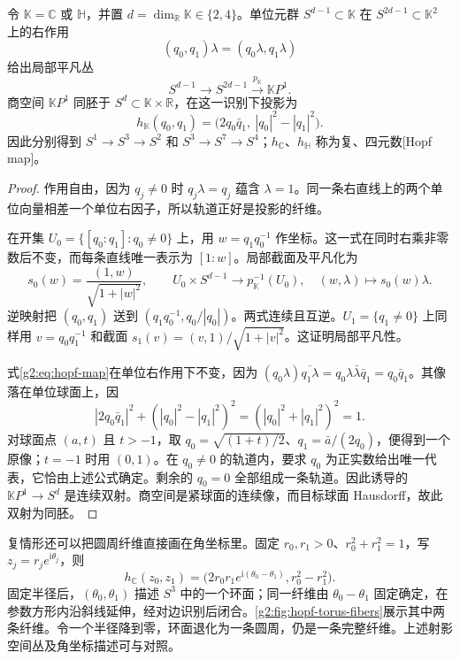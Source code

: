 \begin{proposition}\label{g2:prop:hopf-bundles}
	令 \(\mathbb K=\mathbb C\) 或 \(\mathbb H\)，并置 \(d=\dim_{\mathbb R}\mathbb K\in\{2,4\}\)。单位元群 \(S^{d-1}\subset\mathbb K\) 在 \(S^{2d-1}\subset\mathbb K^2\) 上的右作用
	\[
		(q_0,q_1)\lambda=(q_0\lambda,q_1\lambda)
	\]
	给出局部平凡丛
	\[
		S^{d-1}\longrightarrow S^{2d-1}\xrightarrow{p_{\mathbb K}}\mathbb KP^1.
	\]
	商空间 \(\mathbb KP^1\) 同胚于 \(S^d\subset\mathbb K\times\mathbb R\)，在这一识别下投影为
	\begin{equation}\label{g2:eq:hopf-map}
		h_{\mathbb K}(q_0,q_1)=\bigl(2q_0\bar q_1,\ |q_0|^2-|q_1|^2\bigr).
	\end{equation}
	因此分别得到 \(S^1\rightarrow S^3\rightarrow S^2\) 和 \(S^3\rightarrow S^7\rightarrow S^4\)；\(h_{\mathbb C}\)、\(h_{\mathbb H}\) 称为复、四元数[Hopf map]。
\end{proposition}
\begin{proof}
	作用自由，因为 \(q_j\ne0\) 时 \(q_j\lambda=q_j\) 蕴含 \(\lambda=1\)。同一条右直线上的两个单位向量相差一个单位右因子，所以轨道正好是投影的纤维。

	在开集 \(U_0=\{[q_0:q_1]:q_0\ne0\}\) 上，用 \(w=q_1q_0^{-1}\) 作坐标。这一式在同时右乘非零数后不变，而每条直线唯一表示为 \([1:w]\)。局部截面及平凡化为
	\[
		s_0(w)=\frac{(1,w)}{\sqrt{1+|w|^2}},\qquad
		U_0\times S^{d-1}\longrightarrow p_{\mathbb K}^{-1}(U_0),
		\quad(w,\lambda)\longmapsto s_0(w)\lambda.
	\]
	逆映射把 \((q_0,q_1)\) 送到 \((q_1q_0^{-1},q_0/|q_0|)\)。两式连续且互逆。\(U_1=\{q_1\ne0\}\) 上同样用 \(v=q_0q_1^{-1}\) 和截面 \(s_1(v)=(v,1)/\sqrt{1+|v|^2}\)。这证明局部平凡性。

	式\eqref{g2:eq:hopf-map}在单位右作用下不变，因为 \((q_0\lambda)\overline{q_1\lambda}=q_0\lambda\bar\lambda\bar q_1=q_0\bar q_1\)。其像落在单位球面上，因
	\[
		|2q_0\bar q_1|^2+(|q_0|^2-|q_1|^2)^2=(|q_0|^2+|q_1|^2)^2=1.
	\]
	对球面点 \((a,t)\) 且 \(t>-1\)，取 \(q_0=\sqrt{(1+t)/2}\)、\(q_1=\bar a/(2q_0)\)，便得到一个原像；\(t=-1\) 时用 \((0,1)\)。在 \(q_0\ne0\) 的轨道内，要求 \(q_0\) 为正实数给出唯一代表，它恰由上述公式确定。剩余的 \(q_0=0\) 全部组成一条轨道。因此诱导的 \(\mathbb KP^1\rightarrow S^d\) 是连续双射。商空间是紧球面的连续像，而目标球面 Hausdorff，故此双射为同胚。
\end{proof}

复情形还可以把圆周纤维直接画在角坐标里。固定 \(r_0,r_1>0\)、\(r_0^2+r_1^2=1\)，写 \(z_j=r_j e^{\mathrm{i}\theta_j}\)，则
\[
	h_{\mathbb C}(z_0,z_1)=\bigl(2r_0r_1e^{\mathrm{i}(\theta_0-\theta_1)},r_0^2-r_1^2\bigr).
\]
固定半径后，\((\theta_0,\theta_1)\) 描述 \(S^3\) 中的一个环面；同一纤维由 \(\theta_0-\theta_1\) 固定确定，在参数方形内沿斜线延伸，经对边识别后闭合。\cref{g2:fig:hopf-torus-fibers}展示其中两条纤维。令一个半径降到零，环面退化为一条圆周，仍是一条完整纤维。上述射影空间丛及角坐标描述可与\cite[第4.2节，Fiber Bundles]{Hatcher2002}对照。

